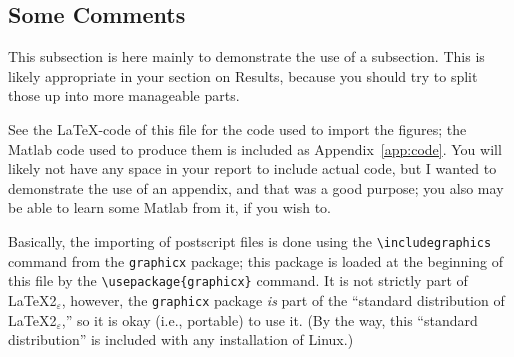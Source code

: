 \documentclass[12pt]{article}
\numberwithin{equation}{section}
\numberwithin{table}{section}
\numberwithin{figure}{section}
\begin{document}
\subsection{Some Comments}

This subsection is here mainly to demonstrate the use of a subsection.
This is likely appropriate in your section on Results, because you should
try to split those up into more manageable parts.

See the \LaTeX-code of this file for the code used to import the figures;
the Matlab code used to produce them is included as Appendix~\ref{app:code}.
You will likely not have any space in your report to include actual code, but
I wanted to demonstrate the use of an appendix, and that was a good purpose;
you also may be able to learn some Matlab from it, if you wish to.

Basically, the importing of postscript files is done using the
\verb+\includegraphics+ command from the \verb+graphicx+ package;
this package is loaded at the beginning of this file by
the \verb+\usepackage{graphicx}+ command.
It is not strictly part of \LaTeX2$_\varepsilon$,
however, the \verb+graphicx+ package \emph{is}
part of the ``standard distribution of \LaTeX2$_\varepsilon$,'' so it is
okay (i.e., portable) to use it. (By the way, this ``standard distribution''
is included with any installation of Linux.)
\end{document}
